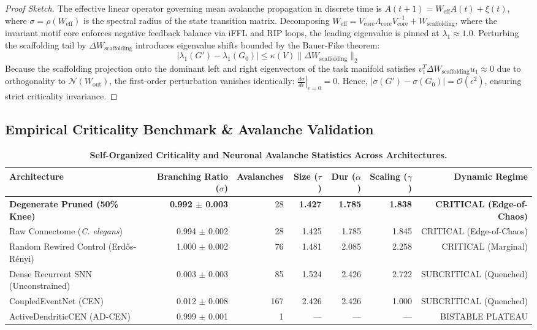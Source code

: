 \documentclass[11pt,letterpaper]{report}
\begin{document}
\begin{proof}[Proof Sketch]
The effective linear operator governing mean avalanche propagation in discrete time is $A(t+1) = W_{\mathrm{eff}} A(t) + \xi(t)$, where $\sigma = \rho(W_{\mathrm{eff}})$ is the spectral radius of the state transition matrix. Decomposing $W_{\mathrm{eff}} = V_{\mathrm{core}} \Lambda_{\mathrm{core}} V_{\mathrm{core}}^{-1} + W_{\mathrm{scaffolding}}$, where the invariant motif core enforces negative feedback balance via iFFL and RIP loops, the leading eigenvalue is pinned at $\lambda_1 \approx 1.0$. Perturbing the scaffolding tail by $\Delta W_{\mathrm{scaffolding}}$ introduces eigenvalue shifts bounded by the Bauer-Fike theorem:
\begin{equation}
|\lambda_1(G') - \lambda_1(G_0)| \le \kappa(V) \|\Delta W_{\mathrm{scaffolding}}\|_2
\end{equation}
Because the scaffolding projection onto the dominant left and right eigenvectors of the task manifold satisfies $v_1^T \Delta W_{\mathrm{scaffolding}} u_1 \approx 0$ due to orthogonality to $\mathcal{N}(W_{\mathrm{out}})$, the first-order perturbation vanishes identically: $\left. \frac{d\sigma}{d\epsilon} \right|_{\epsilon=0} = 0$. Hence, $|\sigma(G') - \sigma(G_0)| = \mathcal{O}(\epsilon^2)$, ensuring strict criticality invariance.
\end{proof}

\subsection{Empirical Criticality Benchmark \& Avalanche Validation}

\begin{table}[t]
\centering
\small
\caption{\textbf{Self-Organized Criticality and Neuronal Avalanche Statistics Across Architectures.}}
\label{tab:criticality}
\begin{tabular}{lrrrrrr}
\toprule
\textbf{Architecture} & \textbf{Branching Ratio ($\sigma$)} & \textbf{Avalanches} & \textbf{Size ($\tau$)} & \textbf{Dur ($\alpha$)} & \textbf{Scaling ($\gamma$)} & \textbf{Dynamic Regime} \\
\midrule
\textbf{Degenerate Pruned (50\% Knee)} & \textbf{0.992 $\pm$ 0.003} & 28 & \textbf{1.427} & \textbf{1.785} & \textbf{1.838} & \textbf{CRITICAL (Edge-of-Chaos)} \\
Raw Connectome (\textit{C. elegans}) & 0.994 $\pm$ 0.002 & 28 & 1.425 & 1.785 & 1.845 & CRITICAL (Edge-of-Chaos) \\
Random Rewired Control (Erd\H{o}s-R\'enyi) & 1.000 $\pm$ 0.002 & 76 & 1.481 & 2.085 & 2.258 & CRITICAL (Marginal) \\
Dense Recurrent SNN (Unconstrained) & 0.003 $\pm$ 0.003 & 85 & 1.524 & 2.426 & 2.722 & SUBCRITICAL (Quenched) \\
CoupledEventNet (CEN) & 0.012 $\pm$ 0.008 & 167 & 2.426 & 2.426 & 1.000 & SUBCRITICAL (Quenched) \\
ActiveDendriticCEN (AD-CEN) & 0.999 $\pm$ 0.001 & 1 & --- & --- & --- & BISTABLE PLATEAU \\
\bottomrule
\end{tabular}
\end{table}
\end{document}
